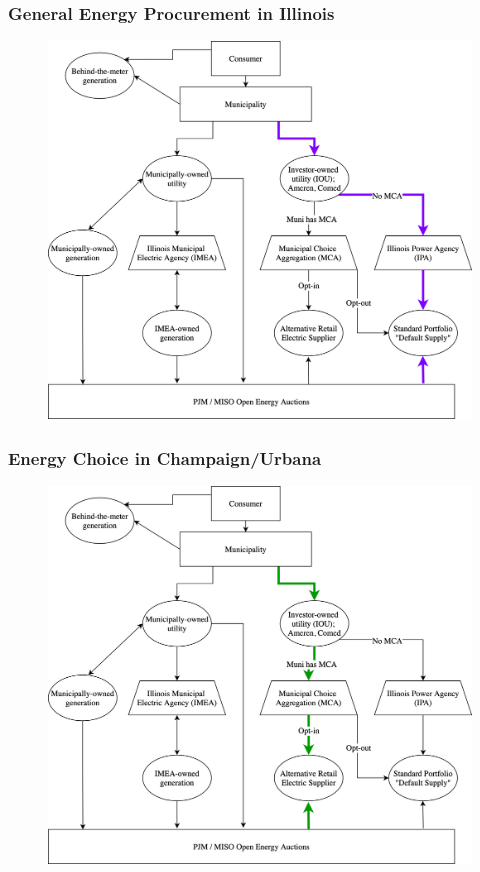 \begin{frame}
    \frametitle{General Energy Procurement in Illinois}
    \begin{figure}
        \centering
        \includegraphics[height=0.8\textheight]{images/generic-electric-choice.png}
    \end{figure}
\end{frame}

\begin{frame}
    \frametitle{Energy Choice in Champaign/Urbana}
    \begin{figure}
        \centering
        \includegraphics[height=0.8\textheight]{images/chambana-electric-choice.png}
    \end{figure}
\end{frame}

